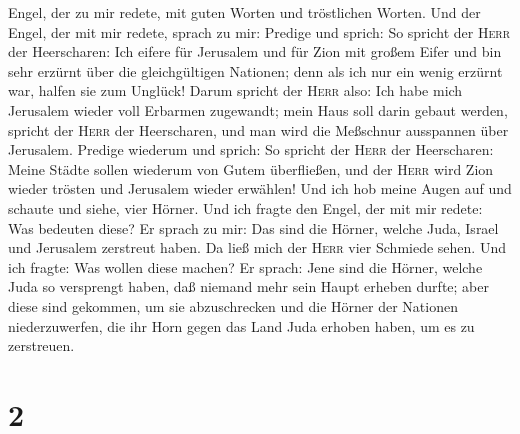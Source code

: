 Engel, der zu mir redete, mit guten Worten und tröstlichen Worten.
 Und der Engel, der mit mir redete, sprach zu mir:
Predige und sprich: So spricht der \textsc{Herr} der Heerscharen: Ich
eifere für Jerusalem und für Zion mit großem Eifer  und
bin sehr erzürnt über die gleichgültigen Nationen; denn als ich nur ein
wenig erzürnt war, halfen sie zum Unglück!  Darum spricht
der \textsc{Herr} also: Ich habe mich Jerusalem wieder voll Erbarmen
zugewandt; mein Haus soll darin gebaut werden, spricht der \textsc{Herr}
der Heerscharen, und man wird die Meßschnur ausspannen über Jerusalem.
 Predige wiederum und sprich: So spricht der
\textsc{Herr} der Heerscharen: Meine Städte sollen wiederum von Gutem
überfließen, und der \textsc{Herr} wird Zion wieder trösten und
Jerusalem wieder erwählen!  Und ich hob meine Augen auf
und schaute und siehe, vier Hörner.  Und ich fragte den
Engel, der mit mir redete: Was bedeuten diese? Er sprach zu mir: Das
sind die Hörner, welche Juda, Israel und Jerusalem zerstreut haben.
 Da ließ mich der \textsc{Herr} vier Schmiede sehen.
 Und ich fragte: Was wollen diese machen? Er sprach: Jene
sind die Hörner, welche Juda so versprengt haben, daß niemand mehr sein
Haupt erheben durfte; aber diese sind gekommen, um sie abzuschrecken und
die Hörner der Nationen niederzuwerfen, die ihr Horn gegen das Land Juda
erhoben haben, um es zu zerstreuen.

\hypertarget{section-1}{%
\section{2}\label{section-1}}

